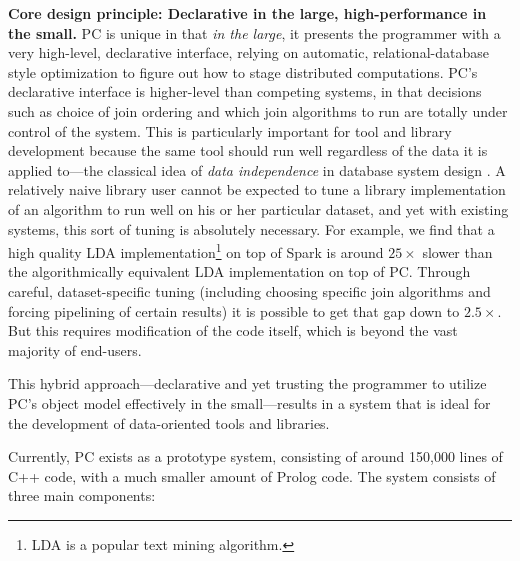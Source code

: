 \vspace{5 pt}
\noindent
\textbf{Core design principle: Declarative in the large, high-performance in the small.}
PC is unique in that \emph{in the large}, 
it presents the programmer with a very high-level,
declarative interface, relying on automatic, 
relational-database style optimization \cite{chaudhuri1998overview} to figure out how to stage
distributed computations.  
PC's declarative interface is higher-level than competing systems, in that decisions such as choice of join ordering and which
join algorithms to run are
totally under control of the system. 
This is particularly important for tool and library development because the same tool should run well regardless of the data
it is applied to---the classical idea of \emph{data independence} in database system design \cite{stonebraker1990third}.
A relatively naive library user cannot be expected to tune a library implementation of an algorithm to run
well on his or her particular dataset, and yet with existing systems, this sort of tuning
is absolutely necessary.  For example, we find
that a high quality LDA implementation\footnote{LDA \cite{blei2003latent} is a popular text mining algorithm.}
on top of Spark is around $25\times$ slower than the algorithmically equivalent LDA
implementation on top of PC.  Through careful, dataset-specific tuning (including choosing specific join algorithms and
forcing pipelining of certain results) it is possible to get that gap down to $2.5\times$.  But this requires modification of the
code itself, which is beyond the vast majority of end-users.

This hybrid approach---declarative and yet trusting the programmer
to utilize PC's object model effectively
in the small---results in a system that is ideal for the 
development of data-oriented tools and libraries.

Currently, PC exists as a prototype system, consisting of around
150,000 lines of C++ code, with a much smaller amount of Prolog code.
The system consists of three main components: 

